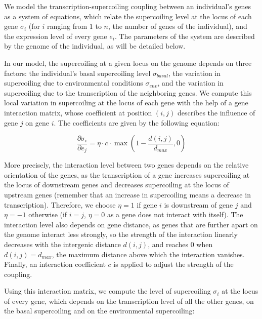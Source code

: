 We model the transcription-supercoiling coupling between an individual's genes as a system of equations, which relate the supercoiling level at the locus of each gene $\sigma_i$ (for $i$ ranging from $1$ to $n$, the number of genes of the individual), and the expression level of every gene $e_i$.
The parameters of the system are described by the genome of the individual, as will be detailed below.

In our model, the supercoiling at a given locus on the genome depends on three factors: the individual's basal supercoiling level $\sigma_{basal}$, the variation in supercoiling due to environmental conditions $\sigma_{env}$, and the variation in supercoiling due to the transcription of the neighboring genes.
We compute this local variation in supercoiling at the locus of each gene with the help of a gene interaction matrix, whose coefficient at position $(i, j)$ describes the influence of gene $j$ on gene $i$.
The coefficients are given by the following equation:

\begin{equation}
\frac{\partial\sigma_{i}}{\partial e_j} = \eta\cdot c \cdot\max(1-\frac{d(i, j)}{d_{max}}, 0)
\label{eq:dsde}
\end{equation}

More precisely, the interaction level between two genes depends on the relative orientation of the genes, as the transcription of a gene increases supercoiling at the locus of downstream genes and decreases supercoiling at the locus of upstream genes (remember that an increase in supercoiling means a decrease in transcription).
Therefore, we choose $\eta = 1$ if gene $i$ is downstream of gene $j$ and $\eta = -1$ otherwise (if $i=j$, $\eta = 0$ as a gene does not interact with itself).
The interaction level also depends on gene distance, as genes that are further apart on the genome interact less strongly, so the strength of the interaction linearly decreases with the intergenic distance $d(i, j)$, and reaches 0 when $d(i, j) = d_{max}$, the maximum distance above which the interaction vanishes.
Finally, an interaction coefficient $c$ is applied to adjust the strength of the coupling.

Using this interaction matrix, we compute the level of supercoiling $\sigma_i$ at the locus of every gene, which depends on the transcription level of all the other genes, on the basal supercoiling and on the environmental supercoiling:


